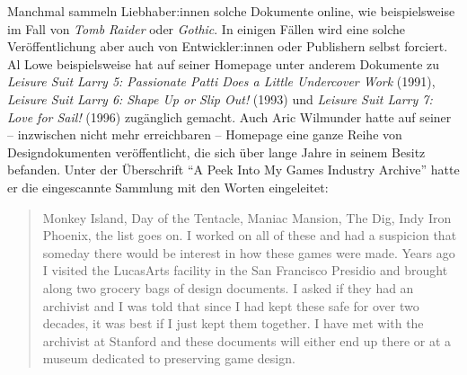\documentclass[a5paper,pagesize,numbers=noenddot]{scrbook}
\begin{document}
Manchmal sammeln Liebhaber:innen solche Dokumente online, wie beispielsweise im Fall von \textit{Tomb Raider} oder \textit{Gothic}.\autocite[Vgl.][]{core_design_tomb_raider,gothic_archive_2024}
In einigen Fällen wird eine solche Veröffentlichung aber auch von Entwickler:innen oder Publishern selbst forciert.
Al Lowe beispielsweise hat auf seiner Homepage unter anderem Dokumente zu \textit{Leisure Suit Larry 5: Passionate Patti Does a Little Undercover Work} (1991), \textit{Leisure Suit Larry 6: Shape Up or Slip Out!} (1993) und \textit{Leisure Suit Larry 7: Love for Sail!} (1996) zugänglich gemacht.\autocite[Vgl.][]{lowe_designs_2025}
Auch Aric Wilmunder hatte auf seiner -- inzwischen nicht mehr erreichbaren -- Homepage eine ganze Reihe von Designdokumenten veröffentlicht, die sich über lange Jahre in seinem Besitz befanden.
Unter der Überschrift \enquote{A Peek Into My Games Industry Archive} hatte er die eingescannte Sammlung mit den Worten eingeleitet:

\begin{quote}
   Monkey Island, Day of the Tentacle, Maniac Mansion, The Dig, Indy Iron Phoenix, the list goes on.
   I worked on all of these and had a suspicion that someday there would be interest in how these games were made.
   Years ago I visited the LucasArts facility in the San Francisco Presidio and brought along two grocery bags of design documents.
   I asked if they had an archivist and I was told that since I had kept these safe for over two decades, it was best if I just kept them together.
   I have met with the archivist at Stanford and these documents will either end up there or at a museum dedicated to preserving game design.\autocite{wilmunder_peek}
\end{quote}
\end{document}

